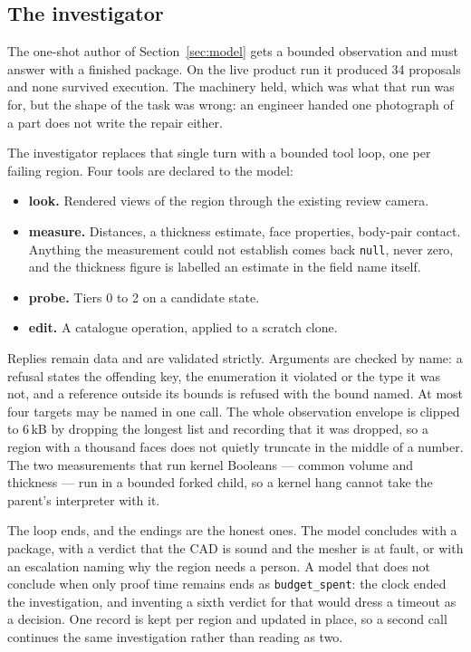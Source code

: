 \documentclass[11pt,onecolumn]{article}
\newcommand{\code}[1]{\texttt{\small #1}}
\begin{document}
\subsection{The investigator}\label{sec:investigator}

The one-shot author of Section~\ref{sec:model} gets a bounded observation and must answer with a
finished package. On the live product run it produced 34 proposals and none survived execution.
The machinery held, which was what that run was for, but the shape of the task was wrong: an
engineer handed one photograph of a part does not write the repair either.

The investigator replaces that single turn with a bounded tool loop, one per failing region. Four
tools are declared to the model:

\begin{itemize}
  \item \textbf{look.} Rendered views of the region through the existing review camera.
  \item \textbf{measure.} Distances, a thickness estimate, face properties, body-pair contact.
        Anything the measurement could not establish comes back \texttt{null}, never zero, and the
        thickness figure is labelled an estimate in the field name itself.
  \item \textbf{probe.} Tiers 0 to 2 on a candidate state.
  \item \textbf{edit.} A catalogue operation, applied to a scratch clone.
\end{itemize}

Replies remain data and are validated strictly. Arguments are checked by name: a refusal states the
offending key, the enumeration it violated or the type it was not, and a reference outside its
bounds is refused with the bound named. At most four targets may be named in one call. The whole
observation envelope is clipped to 6\,kB by dropping the longest list and recording that it was
dropped, so a region with a thousand faces does not quietly truncate in the middle of a number.
The two measurements that run kernel Booleans --- common volume and thickness --- run in a bounded
forked child, so a kernel hang cannot take the parent's interpreter with it.

The loop ends, and the endings are the honest ones. The model concludes with a package, with a
verdict that the CAD is sound and the mesher is at fault, or with an escalation naming why the
region needs a person. A model that does not conclude when only proof time remains ends as
\code{budget\_spent}: the clock ended the investigation, and inventing a sixth verdict for that
would dress a timeout as a decision. One record is kept per region and updated in place, so a
second call continues the same investigation rather than reading as two.
\end{document}
